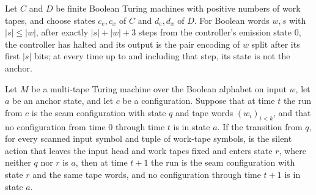 \begin{lemma}
\label{Turing.FinTM.emitterP2_body_emit}
\leanok
{}
Let $C$ and $D$ be finite Boolean Turing machines with positive numbers of work tapes,
and choose states $c_e,c_x$ of $C$ and $d_e,d_x$ of $D$. For Boolean words $w,s$ with
$|s|\le |w|$, after exactly $|s|+|w|+3$ steps from the controller's emission state $0$,
the controller has halted and its output is the pair encoding of $w$ split after its
first $|s|$ bits; at every time up to and including that step, its state is not the
anchor.
\end{lemma}

\begin{lemma}
\label{Turing.FinTM.emitterP2_after}
\leanok
{}
Let $M$ be a multi-tape Turing machine over the Boolean alphabet on input $w$, let $a$
be an anchor state, and let $c$ be a configuration. Suppose that at time $t$ the run
from $c$ is the seam configuration with state $q$ and tape words $(w_i)_{i<k}$, and that
no configuration from time $0$ through time $t$ is in state $a$. If the transition from
$q$, for every scanned input symbol and tuple of work-tape symbols, is the silent action
that leaves the input head and work tapes fixed and enters state $r$, where neither $q$
nor $r$ is $a$, then at time $t+1$ the run is the seam configuration with state $r$ and
the same tape words, and no configuration through time $t+1$ is in state $a$.
\end{lemma}

